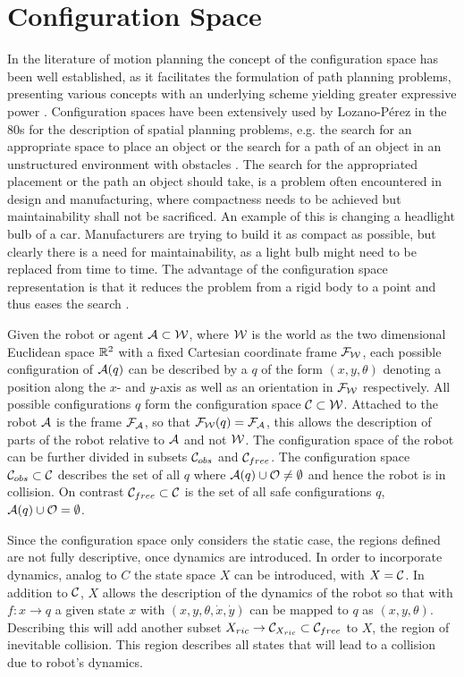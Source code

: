 \section{Configuration Space}
In the literature of motion planning the concept of the configuration space has been well established, as it facilitates the formulation of path planning problems, presenting various concepts with an underlying scheme yielding greater expressive power \cite{LaValle.2006,Latombe.1991}. Configuration spaces have been extensively used by Lozano-P\'{e}rez in the 80s for the description of spatial planning problems, e.g. the search for an appropriate space to place an object or the search for a path of an object in an unstructured environment with obstacles \cite{Latombe.1991}. The search for the appropriated placement or the path an object should take, is a problem often encountered in design and manufacturing, where compactness needs to be achieved but maintainability shall not be sacrificed. An example of this is changing a headlight bulb of a car. Manufacturers are trying to build it as compact as possible, but clearly there is a need for maintainability, as a light bulb might need to be replaced from time to time. The advantage of the configuration space representation is that it reduces the problem from a rigid body to a point and thus eases the search \cite{LozanoPerez.1983}.

Given the robot or agent $\mathcal{A} \subset \mathcal{W}$, where $\mathcal{W}$ is the world as the two dimensional Euclidean space $\mathbb{R}^2$ with a fixed Cartesian coordinate frame $\mathcal{F}_{\mathcal{W}}$, each possible configuration of $\mathcal{A}(q)$ can be described by a $q$ of the form $(x,y,\theta)$ denoting a position along the $x$- and $y$-axis as well as an orientation in $\mathcal{F}_{\mathcal{W}}$ respectively. All possible configurations $q$ form the configuration space $\mathcal{C} \subset \mathcal{W}$. Attached to the robot $\mathcal{A}$ is the frame $\mathcal{F}_{\mathcal{A}}$, so that $\mathcal{F}_{\mathcal{W}}(q) = \mathcal{F}_{\mathcal{A}}$, this allows the description of parts of the robot relative to $\mathcal{A}$ and not $\mathcal{W}$. The configuration space of the robot can be further divided in subsets $\mathcal{C}_{obs}$ and $\mathcal{C}_{free}$. The configuration space $\mathcal{C}_{obs} \subset \mathcal{C}$ describes the set of all $q$ where $\mathcal{A}(q) \cup \mathcal{O} \neq \emptyset$ and hence the robot is in collision. On contrast $\mathcal{C}_{free} \subset \mathcal{C}$ is the set of all safe configurations $q$, $\mathcal{A}(q) \cup \mathcal{O} = \emptyset$. \cite{LaValle.2006,Latombe.1991}

Since the configuration space only considers the static case, the regions defined are not fully descriptive, once dynamics are introduced. In order to incorporate dynamics, analog to $C$ the state space $X$ can be introduced, with $X = \mathcal{C}$. In addition to $\mathcal{C}$, $X$ allows the description of the dynamics of the robot so that with $f: x \to q$ a given state $x$ with $(x,y,\theta,\dot{x},\dot{y})$ can be mapped to $q$ as $(x,y,\theta)$. Describing this will add another subset $X_{ric} \to \mathcal{C}_{X_{ric}} \subset \mathcal{C}_{free}$ to $X$, the region of inevitable collision. This region describes all states that will lead to a collision due to robot's dynamics. \cite{LaValle.2006,Latombe.1991}

